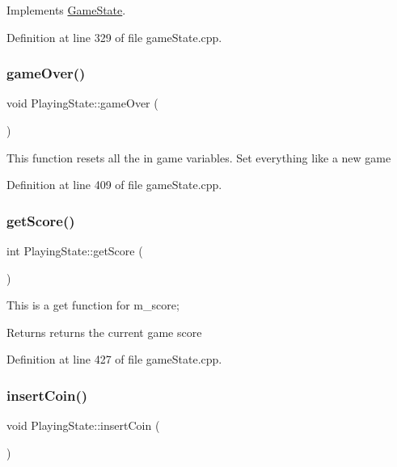 Implements \hyperlink{class_game_state_a5ffd5ce9acb7499ddef613e8836d1ef8}{Game\+State}.



Definition at line 329 of file game\+State.\+cpp.

\mbox{\label{class_playing_state_ac2093c243cc85bb767b27797060aab2c}} 
\subsubsection{\texorpdfstring{game\+Over()}{gameOver()}}
{\footnotesize\ttfamily void Playing\+State\+::game\+Over (\begin{DoxyParamCaption}{ }\end{DoxyParamCaption})}

This function resets all the in game variables. Set everything like a new game 

Definition at line 409 of file game\+State.\+cpp.

\mbox{\label{class_playing_state_ab07b1a4993541b38e81f756ac0f4e46b}} 
\subsubsection{\texorpdfstring{get\+Score()}{getScore()}}
{\footnotesize\ttfamily int Playing\+State\+::get\+Score (\begin{DoxyParamCaption}{ }\end{DoxyParamCaption})}

This is a get function for m\+\_\+score;

\begin{DoxyReturn}{Returns}
returns the current game score 
\end{DoxyReturn}


Definition at line 427 of file game\+State.\+cpp.

\mbox{\label{class_playing_state_a936d41a2041ace2ccb67a9b779d113a7}} 
\subsubsection{\texorpdfstring{insert\+Coin()}{insertCoin()}}
{\footnotesize\ttfamily void Playing\+State\+::insert\+Coin (\begin{DoxyParamCaption}{ }\end{DoxyParamCaption})\hspace{0.3cm}{\ttfamily [virtual]}}


